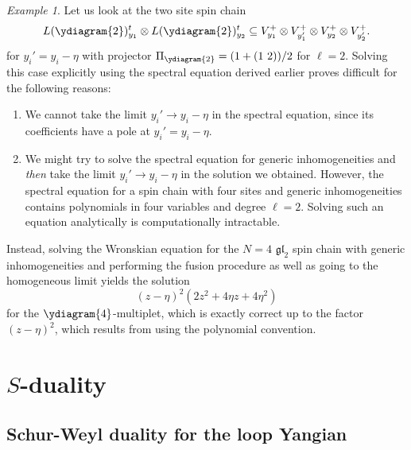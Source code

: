 \documentclass[11pt]{report}
\theoremstyle{definition}
\theoremstyle{remark}
\theoremstyle{remark}
\newtheorem*{example}{Example}
\begin{document}
\begin{example}
Let us look at the two site spin chain
\begin{equation*}
L(\ydiagram{2})_{y_1}^t \otimes L(\ydiagram{2})_{y_2}^t \subseteq V_{y_1}^+ \otimes V_{y_1'}^+ \otimes V_{y_2}^+ \otimes V_{y_2'}^+.
\end{equation*}
for $y_i' = y_i-\eta$ with projector $\Pi_{\ydiagram{2}} = (1 + (1 \ 2))/2$ for $\ell=2$. Solving this case explicitly using the spectral equation derived earlier proves difficult for the following reasons:
\begin{enumerate}[label=(\roman*)]
\item We cannot take the limit $y_i' \to y_i - \eta$ in the spectral equation, since its coefficients have a pole at $y_i'=y_i-\eta$.
\item We might try to solve the spectral equation for generic inhomogeneities and \emph{then} take the limit $y_i' \to y_i - \eta$ in the solution we obtained. However, the spectral equation for a spin chain with four sites and generic inhomogeneities contains polynomials in four variables and degree $\ell = 2$. Solving such an equation analytically is computationally intractable.
\end{enumerate}
Instead, solving the Wronskian equation \cite{book:arutyunov:betheAnsatz} for the $N=4$ $\mathfrak{gl}_2$ spin chain with generic inhomogeneities and performing the fusion procedure as well as going to the homogeneous limit yields the solution
\begin{equation*}
(z-\eta)^2 (2 z^2 + 4 \eta z + 4 \eta^2)
\end{equation*}
for the $\ydiagram{4}$-multiplet, which is exactly correct up to the factor $(z-\eta)^2$, which results from using the polynomial convention.
\end{example}

\section{$S$-duality}

\subsection{Schur-Weyl duality for the loop Yangian}
\end{document}
